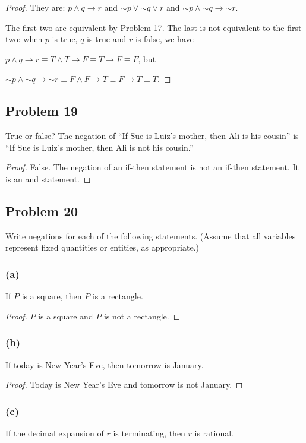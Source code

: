\documentclass[14pt]{extarticle}
\begin{document}
\begin{proof}
They are: $p \wedge q \to r$ and ${\sim p} \vee {\sim q} \vee r$ and ${\sim p}
\wedge {\sim q} \to {\sim r}$.

The first two are equivalent by Problem 17. The last is not equivalent to the
first two: when $p$ is true, $q$ is true and $r$ is false, we have

$p \wedge q \to r \equiv T \wedge T \to F \equiv T \to F \equiv F$, but 

${\sim p} \wedge {\sim q} \to {\sim r} \equiv F \wedge F \to T \equiv F \to T
\equiv T$.
\end{proof}

\subsection{Problem 19}
True or false? The negation of “If Sue is Luiz’s mother, then Ali is his cousin”
is “If Sue is Luiz’s mother, then Ali is not his cousin.”

\begin{proof}
False. The negation of an if-then statement is not an if-then statement. It is
an and statement.
\end{proof}

\subsection{Problem 20}
Write negations for each of the following statements. (Assume that all variables
represent fixed quantities or entities, as appropriate.)

\subsubsection{(a)}
If $P$ is a square, then $P$ is a rectangle.

\begin{proof}
$P$ is a square and $P$ is not a rectangle.
\end{proof}

\subsubsection{(b)}
If today is New Year’s Eve, then tomorrow is January.

\begin{proof}
Today is New Year’s Eve and tomorrow is not January.
\end{proof}

\subsubsection{(c)}
If the decimal expansion of $r$ is terminating, then $r$ is rational.
\end{document}
